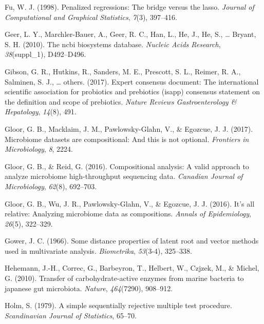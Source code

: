 \documentclass[12pt,a4paper]{reedthesis}
\theoremstyle{definition}
\theoremstyle{definition}
\theoremstyle{definition}
\theoremstyle{remark}
\begin{document}
\leavevmode\hypertarget{ref-fu1998penalized}{}%
Fu, W. J. (1998). Penalized regressions: The bridge versus the lasso. \emph{Journal of Computational and Graphical Statistics}, \emph{7}(3), 397--416.

\leavevmode\hypertarget{ref-geer2010ncbi}{}%
Geer, L. Y., Marchler-Bauer, A., Geer, R. C., Han, L., He, J., He, S., \ldots{} Bryant, S. H. (2010). The ncbi biosystems database. \emph{Nucleic Acids Research}, \emph{38}(suppl\_1), D492--D496.

\leavevmode\hypertarget{ref-gibson2017expert}{}%
Gibson, G. R., Hutkins, R., Sanders, M. E., Prescott, S. L., Reimer, R. A., Salminen, S. J., \ldots{} others. (2017). Expert consensus document: The international scientific association for probiotics and prebiotics (isapp) consensus statement on the definition and scope of prebiotics. \emph{Nature Reviews Gastroenterology \& Hepatology}, \emph{14}(8), 491.

\leavevmode\hypertarget{ref-gloor2017microbiome}{}%
Gloor, G. B., Macklaim, J. M., Pawlowsky-Glahn, V., \& Egozcue, J. J. (2017). Microbiome datasets are compositional: And this is not optional. \emph{Frontiers in Microbiology}, \emph{8}, 2224.

\leavevmode\hypertarget{ref-gloor2016compositional}{}%
Gloor, G. B., \& Reid, G. (2016). Compositional analysis: A valid approach to analyze microbiome high-throughput sequencing data. \emph{Canadian Journal of Microbiology}, \emph{62}(8), 692--703.

\leavevmode\hypertarget{ref-gloor2016relative}{}%
Gloor, G. B., Wu, J. R., Pawlowsky-Glahn, V., \& Egozcue, J. J. (2016). It's all relative: Analyzing microbiome data as compositions. \emph{Annals of Epidemiology}, \emph{26}(5), 322--329.

\leavevmode\hypertarget{ref-gower1966some}{}%
Gower, J. C. (1966). Some distance properties of latent root and vector methods used in multivariate analysis. \emph{Biometrika}, \emph{53}(3-4), 325--338.

\leavevmode\hypertarget{ref-hehemann2010transfer}{}%
Hehemann, J.-H., Correc, G., Barbeyron, T., Helbert, W., Czjzek, M., \& Michel, G. (2010). Transfer of carbohydrate-active enzymes from marine bacteria to japanese gut microbiota. \emph{Nature}, \emph{464}(7290), 908--912.

\leavevmode\hypertarget{ref-holm1979simple}{}%
Holm, S. (1979). A simple sequentially rejective multiple test procedure. \emph{Scandinavian Journal of Statistics}, 65--70.
\end{document}
